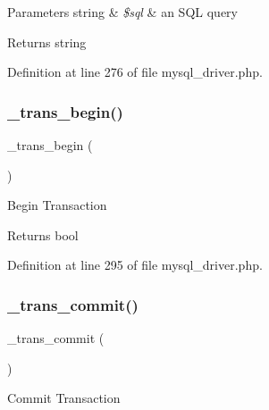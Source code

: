 \begin{DoxyParams}[1]{Parameters}
string & {\em \$sql} & an S\+QL query \\
\hline
\end{DoxyParams}
\begin{DoxyReturn}{Returns}
string 
\end{DoxyReturn}


Definition at line 276 of file mysql\+\_\+driver.\+php.

\mbox{\label{class_c_i___d_b__mysql__driver_ac81ac882c1d54347d810199a15856aac}} 
\subsubsection{\texorpdfstring{\_trans\_begin()}{\_trans\_begin()}}
{\footnotesize\ttfamily \+\_\+trans\+\_\+begin (\begin{DoxyParamCaption}{ }\end{DoxyParamCaption})\hspace{0.3cm}{\ttfamily [protected]}}

Begin Transaction

\begin{DoxyReturn}{Returns}
bool 
\end{DoxyReturn}


Definition at line 295 of file mysql\+\_\+driver.\+php.

\mbox{\label{class_c_i___d_b__mysql__driver_a6fe7f373e0b11cfae23a5f41c0b35dda}} 
\subsubsection{\texorpdfstring{\_trans\_commit()}{\_trans\_commit()}}
{\footnotesize\ttfamily \+\_\+trans\+\_\+commit (\begin{DoxyParamCaption}{ }\end{DoxyParamCaption})\hspace{0.3cm}{\ttfamily [protected]}}

Commit Transaction

